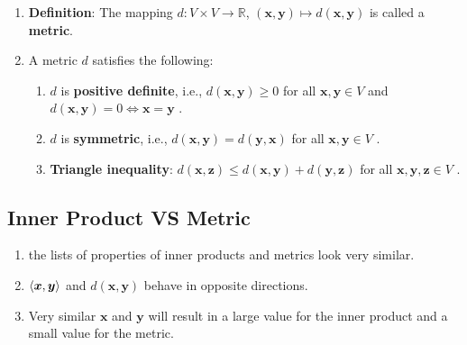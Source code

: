 \begin{enumerate}
    \item \textbf{Definition}: The mapping $d : V \times V \to \mathbb{R}$, $(\bm{x}, \bm{y}) \mapsto d(\bm{x}, \bm{y})$ is called a \textbf{metric}.
    \hfill \cite{mfml/book/mml/Deisenroth-Faisal-Ong}

    \item A metric $d$ satisfies the following:
    \hfill \cite{mfml/book/mml/Deisenroth-Faisal-Ong}
    \begin{enumerate}
        \item $d$ is \textbf{positive definite}, i.e., $d(\bm{x}, \bm{y}) \geq 0$ for all $\bm{x}, \bm{y} \in V$ and $d(\bm{x}, \bm{y}) = 0 \Leftrightarrow \bm{x} = \bm{y}$ .
        \hfill \cite{mfml/book/mml/Deisenroth-Faisal-Ong}

        \item $d$ is \textbf{symmetric}, i.e., $d(\bm{x}, \bm{y}) = d(\bm{y}, \bm{x})$ for all $\bm{x}, \bm{y} \in V$ .
        \hfill \cite{mfml/book/mml/Deisenroth-Faisal-Ong}

        \item \textbf{Triangle inequality}: $d(\bm{x}, \bm{z}) \leq d(\bm{x}, \bm{y}) + d(\bm{y}, \bm{z})$ for all $\bm{x}, \bm{y}, \bm{z} \in V$ .
        \hfill \cite{mfml/book/mml/Deisenroth-Faisal-Ong}
    \end{enumerate}
\end{enumerate}



\subsection{Inner Product VS Metric}

\begin{enumerate}
    \item the lists of properties of inner products and metrics look very similar. 
    \hfill \cite{mfml/book/mml/Deisenroth-Faisal-Ong}

    \item $\langle\bm{x}, \bm{y}\rangle$ and $d(\bm{x}, \bm{y})$ behave in opposite directions.
    \hfill \cite{mfml/book/mml/Deisenroth-Faisal-Ong}

    \item Very similar $\bm{x}$ and $\bm{y}$ will result in a large value for the inner product and a small value for the metric.
    \hfill \cite{mfml/book/mml/Deisenroth-Faisal-Ong}
\end{enumerate}




